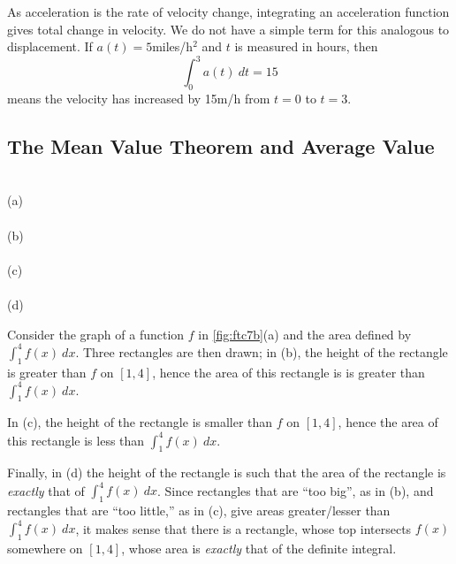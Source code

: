 
As acceleration is the rate of velocity change, integrating an acceleration function gives total change in velocity. We do not have a simple term for this analogous to displacement. If $a(t) = 5$miles/h$^2$ and $t$ is measured in hours, then 
$$\int_0^3 a(t)\ dt = 15$$
means the velocity has increased by 15m/h from $t=0$ to $t=3$.

\subsection*{The Mean Value Theorem and Average Value}

%
{\\
(a)\\
\\
(b)\\
\\
(c)\\
\\
(d)}

Consider the graph of a function $f$ in \autoref{fig:ftc7b}(a) and the area defined by $\int_1^4 f(x)\ dx$. Three rectangles are then drawn; in (b), the height of the rectangle is greater than $f$ on $[1,4]$, hence the area of this rectangle is is greater than $\int_1^4 f(x)\ dx$. 

In (c), the height of the rectangle is smaller than $f$ on $[1,4]$, hence the area of this rectangle is less than $\int_1^4 f(x)\ dx$.

Finally, in (d) the height of the rectangle is such that the area of the rectangle is \textit{exactly} that of $\int_1^4 f(x)\ dx$. Since rectangles that are ``too big\primeskip'', as in (b), and rectangles that are ``too little,'' as in (c), give areas greater/lesser than $\int_1^4 f(x)\ dx$, it makes sense that there is a rectangle, whose top intersects $f(x)$ somewhere on $[1,4]$, whose area is \textit{exactly} that of the definite integral.

